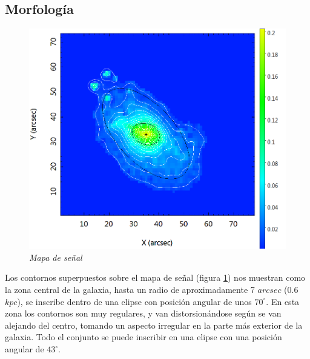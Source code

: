 \documentclass{article}
\begin{document}
\subsection{Morfología}
\begin{minipage}[b]{0.4\linewidth}
	\begin{figure}[H]
	\includegraphics[scale=.20]{imagen3.png}
	\centering	
	\caption{\emph{Mapa de señal}}
	\label{figura 3}
	\end{figure}
\end{minipage} \hfill \begin{minipage}[b]{0.5\linewidth} Los contornos superpuestos sobre el mapa de señal (figura \ref{figura 3}) nos muestran como la zona central de la galaxia, hasta un radio de aproximadamente 7 $arcsec$ (0.6 $kpc$), se inscribe dentro de una elipse con posición angular de unos $70^{\circ}$. En esta zona los contornos son muy regulares, y van distorsionándose según se van alejando del centro, tomando un aspecto irregular en la parte más exterior de la galaxia. Todo el conjunto se puede inscribir en una elipse con una posición angular de $43^{\circ}$.
\end{minipage}
\end{document}

